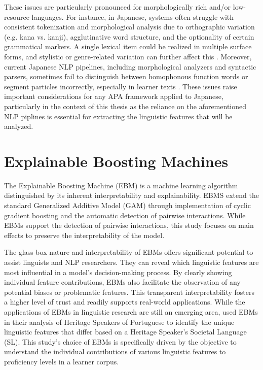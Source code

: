 These issues are particularly pronounced for morphologically rich and/or low-resource languages. For instance,
in Japanese, systems
often
struggle with consistent tokenization and morphological analysis due to orthographic variation (e.g. kana vs.
kanji), agglutinative word structure, and the optionality of certain grammatical markers. A single lexical item
could be realized in multiple surface forms, and stylistic or genre-related variation can further affect this
\citep{halpern2000challenges,izutsu2021}. Moreover, current Japanese NLP pipelines, including morphological
analyzers and syntactic parsers, sometimes fail to distinguish between homophonous function words or segment
particles incorrectly, especially in learner texts \citep{yang1998,nagata2009}. These issues raise important
considerations for any APA framework applied to Japanese, particularly in the context of this thesis as the reliance
on the aforementioned NLP piplines is essential for extracting the linguistic features that will be analyzed.


\section{Explainable Boosting Machines}
The Explainable Boosting Machine (EBM) \citep{nori2019} is a machine learning algorithm distinguished by its
inherent
interpretability and explainability. EBMS extend the standard Generalized Additive Model (GAM) through implementation of
cyclic
gradient boosting and the automatic detection of pairwise interactions. While EBMs support the detection of pairwise
interactions, this study focuses on main effects to preserve the interpretability of the model.

The glass-box nature and interpretability of EBMs offers significant potential to assist linguists and NLP
researchers. They can reveal
which linguistic
features are
most influential in a model's decision-making process. By clearly showing individual feature contributions, EBMs
also facilitate the observation of any potential biases or problematic features. This transparent interpretability
fosters a higher level of trust and readily supports real-world applications.
While the applications of EBMs in linguistic research are still an emerging area, \citet{akef2025} used EBMs in their
analysis of
Heritage Speakers of Portuguese to identify the unique linguistic features that differ based on a Heritage Speaker's
Societal Language (SL). This study's choice of EBMs is specifically driven by the objective to understand the
individual contributions of various linguistic features to proficiency levels in a learner corpus.